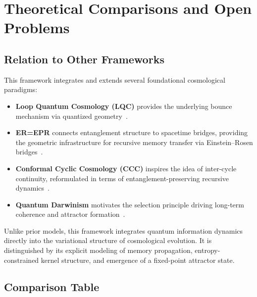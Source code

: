 \section{Theoretical Comparisons and Open Problems}
\label{sec:comparisons}

\subsection{Relation to Other Frameworks}

This framework integrates and extends several foundational cosmological paradigms:
\begin{itemize}
    \item \textbf{Loop Quantum Cosmology (LQC)} provides the underlying bounce mechanism via quantized geometry~\cite{ashtekar2006quantum, bojowald2001absence}.
    \item \textbf{ER=EPR} connects entanglement structure to spacetime bridges, providing the geometric infrastructure for recursive memory transfer via Einstein–Rosen bridges~\cite{maldacena2013cool}.
    \item \textbf{Conformal Cyclic Cosmology (CCC)} inspires the idea of inter-cycle continuity, reformulated in terms of entanglement-preserving recursive dynamics~\cite{penrose2010cycles}.
    \item \textbf{Quantum Darwinism} motivates the selection principle driving long-term coherence and attractor formation~\cite{zurek_quantum_2009}.
\end{itemize}

Unlike prior models, this framework integrates quantum information dynamics directly into the variational structure of cosmological evolution. It is distinguished by its explicit modeling of memory propagation, entropy-constrained kernel structure, and emergence of a fixed-point attractor state.

\subsection{Comparison Table}

